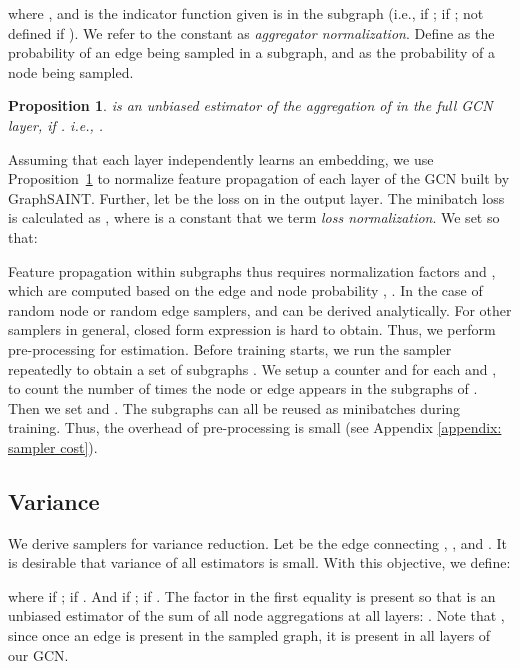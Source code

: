 \documentclass{article} \usepackage{iclr2020_conference,times}
\newtheorem{proposition}[theorem]{Proposition}
\newcommand{\graphsaint}{{\fontfamily{lmtt}\selectfont GraphSAINT}}
\begin{document}
where , and  is the indicator function given  is in the subgraph (i.e.,  if ;  if ;  not defined if ). We refer to the constant  as \emph{aggregator normalization}.
Define  as the probability of an edge  being sampled in a subgraph, and  as the probability of a node  being sampled.
\begin{proposition}
\label{prop: norm}
 is an unbiased estimator of the aggregation of  in the full  GCN layer, if . i.e.,  
.
\end{proposition}

Assuming that each layer independently learns an embedding, we use Proposition~\ref{prop: norm} to normalize feature propagation of each layer of the GCN built by \graphsaint.
Further, let  be the loss on  in the output layer. The minibatch loss is calculated as , where  is a constant that we term \emph{loss normalization}. We set  so that:


Feature propagation within subgraphs thus requires normalization factors  and , which are computed based on the edge and node probability , . 
In the case of random node or random edge samplers,  and  can be derived analytically. For other samplers in general, closed form expression is hard to obtain. Thus, we perform pre-processing for estimation. 
Before training starts, we run the sampler repeatedly to obtain a set of  subgraphs . We setup a counter  and  for each  and , to count the number of times the node or edge appears in the subgraphs of . 
Then we set  and .
The subgraphs  can all be reused as minibatches during training. Thus, the overhead of pre-processing is small (see Appendix \ref{appendix: sampler cost}). 











\subsection{Variance}
\label{sec: var}
We derive samplers for variance reduction. Let  be the edge connecting , , and . It is desirable that variance of all estimators  is small. With this objective, we define:

where  if ;  if . And  if ;  if . The factor  in the first equality is present so that  is an unbiased estimator of the sum of all node aggregations at all layers: . Note that , since once an edge is present in the sampled graph, it is present in all layers of our GCN. 
\end{document}
